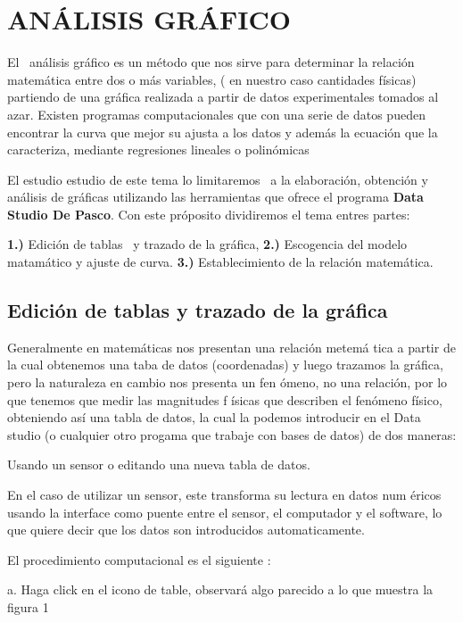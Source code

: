 \documentclass[12pt]{article}
\begin{document}
\section{AN\'{A}LISIS GR\'{A}FICO}

El \ an\'{a}lisis gr\'{a}fico es un m\'{e}todo que nos sirve para determinar
la relaci\'{o}n matem\'{a}tica entre dos o m\'{a}s variables, ( en nuestro
caso cantidades f\'{i}sicas) partiendo de una gr\'{a}fica realizada a partir
de datos experimentales tomados al azar. Existen programas computacionales
que con una serie de datos pueden encontrar la curva que mejor su ajusta a
los datos y adem\'{a}s la ecuaci\'{o}n que la caracteriza, mediante
regresiones lineales o polin\'{o}micas

El estudio estudio de este tema lo limitaremos \ a la elaboraci\'{o}n,
obtenci\'{o}n y an\'{a}lisis de gr\'{a}ficas utilizando las herramientas que
ofrece el programa \textbf{Data Studio De Pasco}. Con este pr\'{o}posito
dividiremos el tema entres partes:

\textbf{1.) }Edici\'{o}n de tablas \ y trazado de la gr\'{a}fica, \textbf{%
2.) }Escogencia del modelo matam\'{a}tico y ajuste de curva. \textbf{3.) }%
Establecimiento de la relaci\'{o}n matem\'{a}tica.

\subsection{Edici\'{o}n de tablas y trazado de la gr\'{a}fica}

Generalmente en matem\'{a}ticas nos presentan una relaci\'{o}n metem\'{a}%
tica a partir de la cual obtenemos una taba de datos (coordenadas) y luego
trazamos la gr\'{a}fica, pero la naturaleza en cambio nos presenta un fen%
\'{o}meno, no una relaci\'{o}n, por lo que tenemos que medir las magnitudes f%
\'{i}sicas que describen el fen\'{o}meno f\'{i}sico, obteniendo as\'{i} una
tabla de datos, la cual la podemos introducir en el Data studio (o cualquier
otro progama que trabaje con bases de datos) de dos maneras:

Usando un sensor o editando una nueva tabla de datos.

En el caso de utilizar un sensor, este transforma su lectura en datos num%
\'{e}ricos usando la interface como puente entre el sensor, el computador y
el software, lo que quiere decir que los datos son introducidos
automaticamente.

El procedimiento computacional es el siguiente :

a. Haga click en el icono de table, observar\'{a} algo parecido a lo que
muestra la figura 1
\end{document}
